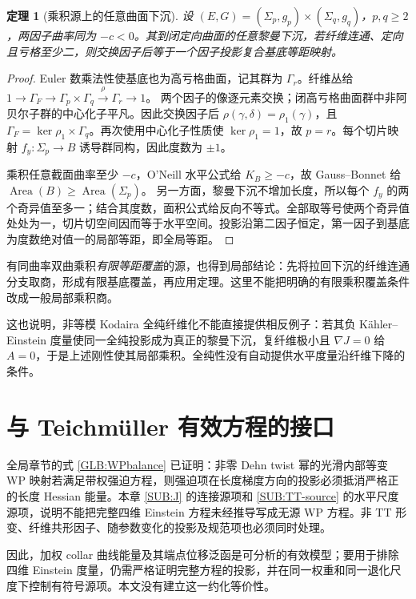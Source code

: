 \documentclass[UTF8,fontset=fandol,zihao=-4,oneside,openany]{ctexbook}
\theoremstyle{cjkplain}
\newtheorem{theorem}{定理}[chapter]
\numberwithin{equation}{chapter}
\begin{document}
\begin{theorem}[乘积源上的任意曲面下沉]\label{SUB:all-product-submersions}
设 $(E,G)=(\Sigma_p,g_p)\times(\Sigma_q,g_q)$，$p,q\ge2$，两因子曲率同为 $-c<0$。其到闭定向曲面的任意黎曼下沉，若纤维连通、定向且亏格至少二，则交换因子后等于一个因子投影复合基底等距映射。
\end{theorem}
\begin{proof}
Euler 数乘法性使基底也为高亏格曲面，记其群为 $\Gamma_r$。纤维丛给
$1\to\Gamma_F\to\Gamma_p\times\Gamma_q\xrightarrow\rho\Gamma_r\to1$。
两个因子的像逐元素交换；闭高亏格曲面群中非阿贝尔子群的中心化子平凡。因此交换因子后 $\rho(\gamma,\delta)=\rho_1(\gamma)$，且
$\Gamma_F=\ker\rho_1\times\Gamma_q$。再次使用中心化子性质使 $\ker\rho_1=1$，故 $p=r$。每个切片映射 $f_y:\Sigma_p\to B$ 诱导群同构，因此度数为 $\pm1$。

乘积任意截面曲率至少 $-c$，O'Neill 水平公式给 $K_B\ge-c$，故 Gauss--Bonnet 给
$\operatorname{Area}(B)\ge\operatorname{Area}(\Sigma_p)$。
另一方面，黎曼下沉不增加长度，所以每个 $f_y$ 的两个奇异值至多一；结合其度数，面积公式给反向不等式。全部取等号使两个奇异值处处为一，切片切空间因而等于水平空间。投影沿第二因子恒定，第一因子到基底为度数绝对值一的局部等距，即全局等距。
\end{proof}

有同曲率双曲乘积\emph{有限等距覆盖}的源，也得到局部结论：先将拉回下沉的纤维连通分支取商，形成有限基底覆盖，再应用定理。这里不能把明确的有限乘积覆盖条件改成一般局部乘积商。

这也说明，非等模 Kodaira 全纯纤维化不能直接提供相反例子：若其负 Kähler--Einstein 度量使同一全纯投影成为真正的黎曼下沉，复纤维极小且 $\nabla J=0$ 给 $A=0$，于是上述刚性使其局部乘积。全纯性没有自动提供水平度量沿纤维下降的条件。


\section{与 Teichmüller 有效方程的接口}

全局章节的式 \eqref{GLB:WPbalance} 已证明：非零 Dehn twist 幂的光滑内部等变 WP 映射若满足带权强迫方程，则强迫项在长度梯度方向的投影必须抵消严格正的长度 Hessian 能量。本章 \eqref{SUB:J} 的连接源项和 \eqref{SUB:TT-source} 的水平尺度源项，说明不能把完整四维 Einstein 方程未经推导写成无源 WP 方程。非 TT 形变、纤维共形因子、随参数变化的投影及规范项也必须同时处理。

因此，加权 collar 曲线能量及其端点位移泛函是可分析的有效模型；要用于排除四维 Einstein 度量，仍需严格证明完整方程的投影，并在同一权重和同一退化尺度下控制有符号源项。本文没有建立这一约化等价性。
\end{document}
